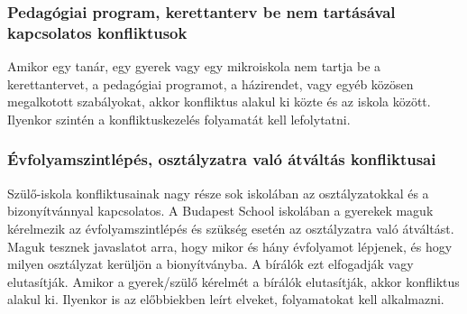 \subsubsection{Pedagógiai program, kerettanterv be nem tartásával kapcsolatos konfliktusok}

Amikor egy tanár, egy gyerek vagy egy mikroiskola nem tartja be a kerettantervet, a pedagógiai programot, a házirendet, vagy egyéb közösen megalkotott szabályokat, akkor konfliktus alakul ki közte és az iskola között. Ilyenkor szintén a konfliktuskezelés folyamatát kell lefolytatni.

\subsubsection{Évfolyamszintlépés, osztályzatra való átváltás konfliktusai}
Szülő-iskola konfliktusainak nagy része sok iskolában az osztályzatokkal és a bizonyítvánnyal kapcsolatos. A Budapest School iskolában a gyerekek maguk kérelmezik az évfolyamszintlépés és szükség esetén az osztályzatra való átváltást. Maguk tesznek javaslatot arra, hogy mikor és hány évfolyamot lépjenek, és hogy milyen osztályzat kerüljön a bionyítványba. A bírálók ezt elfogadják vagy elutasítják. Amikor a gyerek/szülő kérelmét a bírálók elutasítják, akkor konfliktus alakul ki. Ilyenkor is az előbbiekben leírt elveket, folyamatokat kell alkalmazni.
